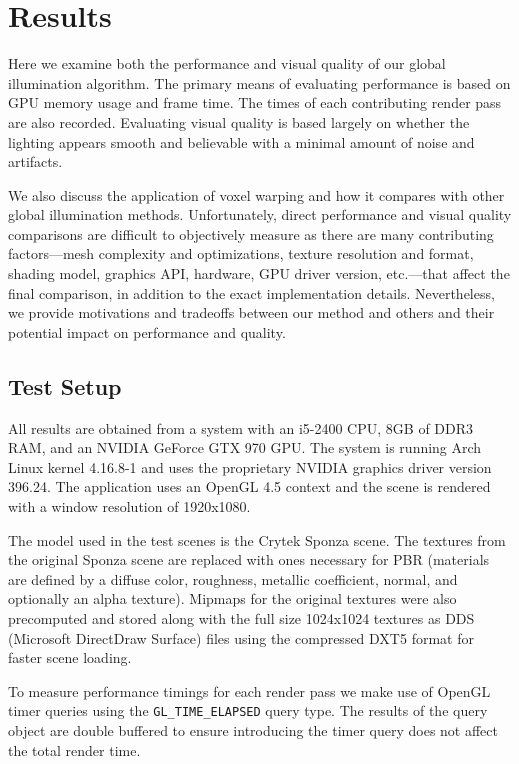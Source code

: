 \chapter{Results}

Here we examine both the performance and visual quality of our global illumination algorithm. The primary means of evaluating performance is based on GPU memory usage and frame time. The times of each contributing render pass are also recorded. Evaluating visual quality is based largely on whether the lighting appears smooth and believable with a minimal amount of noise and artifacts.

We also discuss the application of voxel warping and how it compares with other global illumination methods. Unfortunately, direct performance and visual quality comparisons are difficult to objectively measure as there are many contributing factors---mesh complexity and optimizations, texture resolution and format, shading model, graphics API, hardware, GPU driver version, etc.---that affect the final comparison, in addition to the exact implementation details. Nevertheless, we provide motivations and tradeoffs between our method and others and their potential impact on performance and quality.

\section{Test Setup}
All results are obtained from a system with an i5-2400 CPU, 8GB of DDR3 RAM, and an NVIDIA GeForce GTX 970 GPU. The system is running Arch Linux kernel 4.16.8-1 and uses the proprietary NVIDIA graphics driver version 396.24. The application uses an OpenGL 4.5 context and the scene is rendered with a window resolution of 1920x1080.

The model used in the test scenes is the Crytek Sponza scene. The textures from the original Sponza scene are replaced with ones necessary for PBR (materials are defined by a diffuse color, roughness, metallic coefficient, normal, and optionally an alpha texture). Mipmaps for the original textures were also precomputed and stored along with the full size 1024x1024 textures as DDS (Microsoft DirectDraw Surface) files using the compressed DXT5 format for faster scene loading.

To measure performance timings for each render pass we make use of OpenGL timer queries using the \verb#GL_TIME_ELAPSED# query type. The results of the query object are double buffered to ensure introducing the timer query does not affect the total render time.

